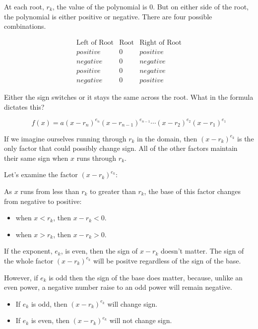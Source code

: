 \documentclass{ximera}
\begin{document}
At each root, $r_k$, the value of the polynomial is $0$.  But on either side of the root, the polynomial is either positive or negative. There are four possible combinations.


\[
\begin{array}{rcl}
\text{Left of Root}  & \text{Root}  & \text{Right of Root} \\
positive & 0 & positive \\
negative & 0 & negative \\
positive & 0 & negative \\
negative & 0 & positive
\end{array}
\]


Either the sign switches or it stays the same across the root.  What in the formula dictates this?



\[   f(x) = a (x-r_n)^{e_n} (x-r_{n-1})^{e_{n-1}}  \cdots (x-r_2)^{e_2} (x-r_1)^{e_1}  \]


If we imagine ourselves running through $r_k$ in the domain, then $(x-r_k)^{e_k}$ is the only factor that could possibly change sign.  All of the other factors maintain their same sign when $x$ runs through $r_k$.



Let's examine the factor $(x-r_k)^{e_k}$:

As $x$ runs from less than $r_k$ to greater than $r_k$, the base of this factor changes from negative to positive:

\begin{itemize}
\item when $x<r_k$, then $x-r_k <0$.  \\

\item when $x>r_k$, then $x-r_k >0$. \\
\end{itemize}


If the exponent, $e_k$, is even, then the sign of $x-r_k$ doesn't matter. The sign of the whole factor $(x-r_k)^{e_k}$ will be positve regardless of the sign of the base.

However, if $e_k$ is odd then the sign of the base does matter, because, unlike an even power, a negative number raise to an odd power will remain negative.





\begin{itemize}
\item If $e_k$ is odd, then $(x-r_k)^{e_k}$ will change sign.
\item If $e_k$ is even, then $(x-r_k)^{e_k}$ will not change sign.
\end{itemize}
\end{document}
